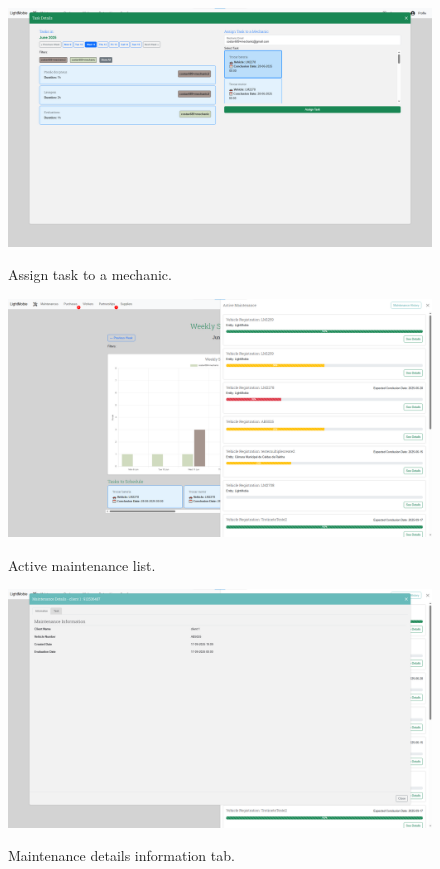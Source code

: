 \begin{figure}[htbp]
  \caption{Assign task to a mechanic.}
  \centering
  \includegraphics[width=\textwidth]{figs/Implementation/workshopmanager/addTask}
  \label{fig:workshopmanagerAssignTask}
\end{figure}


\begin{figure}[htbp]
  \caption{Active maintenance list.}
  \centering
  \includegraphics[width=\textwidth]{figs/Implementation/workshopmanager/maintenanceList}
  \label{fig:workshopmanagerMaintenanceList}
\end{figure}


\begin{figure}[htbp]
  \caption{Maintenance details information tab.}
  \centering
  \includegraphics[width=\textwidth]{figs/Implementation/workshopmanager/maintenanceDetails}
  \label{fig:workshopmanagerMaintenanceDetails}
\end{figure}

